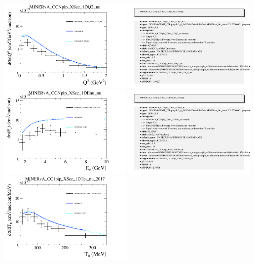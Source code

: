 \documentclass{article}
\begin{document}
\centering
\includegraphics[width=0.49\textwidth]{figures/nuisance_MINERvA_CCNpip_XSec_1DQ2_nu_comp.png}
\includegraphics[width=0.49\textwidth]{figures/nuisance_MINERvA_CCNpip_XSec_1DQ2_nu_info.png}
\centering
\includegraphics[width=0.49\textwidth]{figures/nuisance_MINERvA_CCNpip_XSec_1DEnu_nu_comp.png}
\includegraphics[width=0.49\textwidth]{figures/nuisance_MINERvA_CCNpip_XSec_1DEnu_nu_info.png}
\centering
\includegraphics[width=0.49\textwidth]{figures/nuisance_MINERvA_CC1pip_XSec_1DTpi_nu_2017_comp.png}
\end{document}

